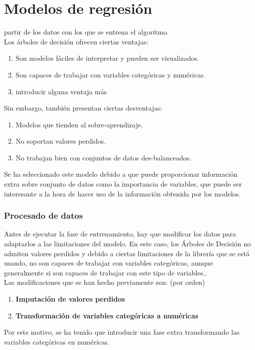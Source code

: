 \section{Modelos de regresión}
partir de los datos con los que se entrena el algoritmo.\\
Los árboles de decisión ofrecen ciertas ventajas:
\begin{enumerate}
	\item Son modelos fáciles de interpretar y pueden ser visualizados.
	\item Son capaces de trabajar con variables categóricas y numéricas.
	\item introducir alguna ventaja más
\end{enumerate}
Sin embargo, también presentan ciertas desventajas:
\begin{enumerate}
	\item Modelos que tienden al sobre-aprendizaje.
	\item No soportan valores perdidos.
	\item No trabajan bien con conjuntos de datos des-balanceados.
\end{enumerate}
Se ha seleccionado este modelo debido a que puede proporcionar información extra sobre conjunto de datos como la importancia de variables, que puede ser interesante a la hora de hacer uso de la información obtenida por los modelos.
\subsubsection*{Procesado de datos}
Antes de ejecutar la fase de entrenamiento, hay que modificar los datos para adaptarlos a las limitaciones del modelo. En este caso, los Árboles de Decisión no admiten valores perdidos y debido a ciertas limitaciones de la librería que se está usando, no son capaces de trabajar con variables categóricas, aunque generalmente si son capaces de trabajar con este tipo de variables..\\
Las modificaciones que se han hecho previamente son: (por orden)
\begin{enumerate}
	\item \textbf{Imputación de valores perdidos}
	\item \textbf{Transformación de variables categóricas a numéricas}
\end{enumerate}
Por este motivo, se ha tenido que introducir una fase extra transformando las variables categóricas en numéricas.
